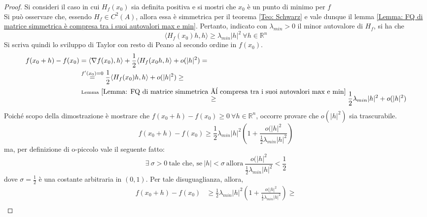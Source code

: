     \begin{proof}
        Si consideri il caso in cui $H_f(x_0)$ sia definita positiva e si mostri che $x_0$ è un punto di minimo per $f$\\
        Si può osservare che, essendo $H_f \in C^2(A)$, allora essa è simmetrica per il teorema \ref{Teo: Schwarz} e vale dunque il lemma \ref{Lemma: FQ di matrice simmetrica è compresa tra i suoi autovalori max e min}. Pertanto, indicato con $\lambda_{min}>0$ il minor autovalore di $H_f$, si ha che
        \begin{equation}
            \langle H_f(x_0)h,h \rangle \geq \lambda_{min} |h|^2\ \forall h \in \mathbb{R}^n
        \end{equation}
        Si scriva quindi lo sviluppo di Taylor con resto di Peano al secondo ordine in $f(x_0)$.
        \begin{equation}
        \begin{aligned}
            f(x_0+h)-f(x_0)&= \langle \nabla f(x_0), h \rangle + \frac{1}{2}\langle H_f(x_0h, h\rangle + o(|h|^2)=\\
            &\overset{f'(x_0)=0}{=} \frac{1}{2}\langle H_f(x_0)h, h\rangle + o(|h|^2) \geq \\
            &\overset{\text{Lemma}\ \ref{Lemma: FQ di matrice simmetrica è compresa tra i suoi autovalori max e min}}{\geq} \frac{1}{2} \lambda_{min}|h|^2+o(|h|^2)
        \end{aligned}
        \end{equation}
        Poiché scopo della dimostrazione è mostrare che $f(x_0+h)-f(x_0) \geq 0\ \forall h \in \mathbb{R}^n$, occorre provare che $o(|h|^2)$ sia trascurabile.
        \begin{equation}
            f(x_0+h)- f(x_0) \geq \frac{1}{2}\lambda_{min} |h|^2 \left( 1 + \frac{o(|h|^2}{\tfrac{1}{2}\lambda_{min}|h|^2}\right)
        \end{equation}
        ma, per definizione di o-piccolo vale il seguente fatto:
        \begin{equation}
            \exists\ \sigma >0\ \text{tale che, se}\ |h|<\sigma\ \text{allora}\ \frac{o(|h|^2}{\tfrac{1}{2}\lambda_{min} |h|^2} < \frac{1}{2}
        \end{equation}
        dove $\sigma=\frac{1}{2}$ è una costante arbitraria in $(0,1)$.
        Per tale disuguaglianza, allora, 
        \begin{equation}
        \begin{aligned}
            f(x_0+h)-f(x_0)&\geq \frac{1}{2}\lambda_{min} |h|^2 \left( 1 + \frac{o(|h|^2}{\tfrac{1}{2}\lambda_{min}|h|^2}\right) \geq \\

\end{aligned}
\end{equation}
\end{proof}
